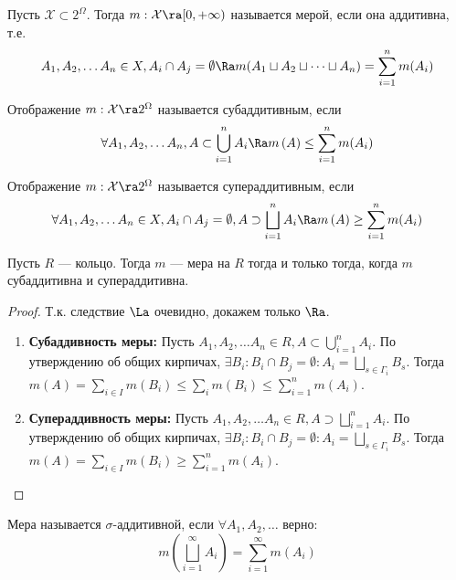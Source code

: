 

\begin{definition}
    Пусть \(\mathcal{X} \subset 2^\Omega\). Тогда \(m: \mathcal{X} \ra [0, +\infty)\) называется мерой, если она аддитивна, т.е.
    \[A_1, A_2, \dots A_n \in X, A_i \cap A_j = \emptyset \Ra m(A_1 \sqcup A_2 \sqcup \dots \sqcup A_n) = \sum_{i = 1}^n m(A_i)\]
\end{definition}

\begin{definition}
    Отображение \(m: \mathcal{X} \ra 2^\Omega\) называется субаддитивным, если 
    \[\forall A_1, A_2, \dots A_n, A \subset \bigcup_{i = 1}^n A_i \Ra m\left( A  \right) \le \sum_{i = 1}^n m(A_i)\]
\end{definition}

\begin{definition}
    Отображение \(m: \mathcal{X} \ra 2^\Omega\) называется супераддитивным, если 
    \[\forall A_1, A_2, \dots A_n \in X, A_i \cap A_j = \emptyset, A \supset \bigsqcup_{i = 1}^n A_i  \Ra m\left( A \right) \ge \sum_{i = 1}^n m(A_i)\]
\end{definition}

\begin{proposition}
    Пусть \(R\) --- кольцо. Тогда \(m\) --- мера на \(R\) тогда и только тогда, когда \(m\) субаддитивна и супераддитивна.
\end{proposition}
\begin{proof}
    Т.к. следствие \(\La\) очевидно, докажем только \(\Ra\).
    \begin{enumerate}
        \item[] \textbf{Субаддивность меры:} Пусть \(A_1, A_2, \dots A_n \in R, A \subset \bigcup_{i = 1}^n A_i\). По утверждению об общих кирпичах, \(\exists B_i: B_i \cap B_j = \emptyset: A_i = \bigsqcup_{s \in \Gamma_i} B_s\). Тогда \(m(A) = \sum_{i \in I} m(B_i)\le \sum_i m(B_i) \le \sum_{i = 1}^n m(A_i)\).
        \item[] \textbf{Супераддивность меры:} Пусть \(A_1, A_2, \dots A_n \in R, A \supset \bigsqcup_{i = 1}^n A_i\). По утверждению об общих кирпичах, \(\exists B_i: B_i \cap B_j = \emptyset: A_i = \bigsqcup_{s \in \Gamma_i} B_s\). Тогда \(m(A) = \sum_{i \in I} m(B_i)\ge \sum_{i = 1}^n m(A_i)\).
    \end{enumerate}
\end{proof}

\begin{definition}
    Мера называется \(\sigma\)-аддитивной, если \(\forall A_1, A_2, \dots\) верно:
    \[m\left( \bigsqcup_{i = 1}^\infty A_i \right) = \sum_{i = 1}^\infty m(A_i)\]
\end{definition}

